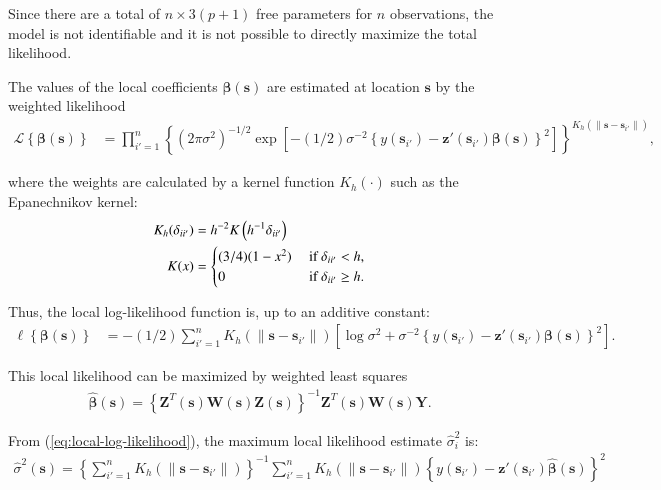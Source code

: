 \documentclass[authoryear, review, 11pt]{elsarticle}
\begin{document}
	Since there are a total of $n \times 3(p+1)$ free parameters for $n$ observations, the model is not identifiable and it is not possible to directly maximize the total likelihood.
  
    The values of the local coefficients $\bm{\beta}(\bm{s})$ are estimated at location $\bm{s}$ by the weighted likelihood
    \begin{align}\label{eq:local-likelihood}
		\mathcal{L} \left\{ \bm{\beta}(\bm{s}) \right\} &= \prod_{i'=1}^n \left\{ \left(2 \pi \sigma^2  \right)^{-1/2}  \exp \left[ -(1/2) \sigma^{-2}  \left\{ y(\bm{s}_{i'}) - \bm{z}'(\bm{s}_{i'}) \bm{\beta}(\bm{s}) \right\}^2 \right] \right\} ^ {K_h( \| \bm{s} - \bm{s}_{i'} \| )},
	\end{align}
  
    where the weights are calculated by a kernel function $K_h(\cdot)$ such as the Epanechnikov kernel:
    \begin{align}\label{eq:epanechnikov}
        K_h(\delta_{ii'}) &= h^{-2} K\left( h^{-1} \delta_{ii'} \right) \notag \\
        K(x) &= \begin{cases} (3/4) (1-x^2) &\mbox{ if } \delta_{ii'} < h, \\ 0 &\mbox{ if } \delta_{ii'} \geq h. \end{cases}
	\end{align}
  
  Thus, the local log-likelihood function is, up to an additive constant: 
  \begin{align}\label{eq:local-log-likelihood}
		\ell \left\{ \bm{\beta}(\bm{s}) \right\} &= -(1/2) \sum_{i'=1}^n K_h( \| \bm{s} - \bm{s}_{i'} \| ) \left[ \log{\sigma^2}  + \sigma^{-2}  \left\{ y(\bm{s}_{i'}) - \bm{z}'(\bm{s}_{i'}) \bm{\beta}(\bm{s}) \right\}^2 \right].
  \end{align}
  
  This local likelihood can be maximized by weighted least squares
  \begin{align}\label{eq:beta-hat}
    \hat{\bm{\beta}}(\bm{s}) = \left\{ \bm{Z}^T(\bm{s}) \bm{W}(\bm{s}) \bm{Z}(\bm{s}) \right\}^{-1} \bm{Z}^T(\bm{s}) \bm{W}(\bm{s}) \bm{Y}.
  \end{align}
	
  From (\ref{eq:local-log-likelihood}), the maximum local likelihood estimate $\hat{\sigma}_i^2$ is:	 
  \begin{align}
    \hat{\sigma}^2(\bm{s}) = \left\{ \sum \limits_{i'=1}^{n} K_h( \| \bm{s} - \bm{s}_{i'} \| ) \right\}^{-1} \sum \limits_{i'=1}^n K_h( \| \bm{s} - \bm{s}_{i'} \| ) \left\{ y(\bm{s}_{i'}) - \bm{z}'(\bm{s}_{i'}) \hat{\bm{\beta}}(\bm{s}) \right\}^2
  \end{align}
	 
\end{document}
